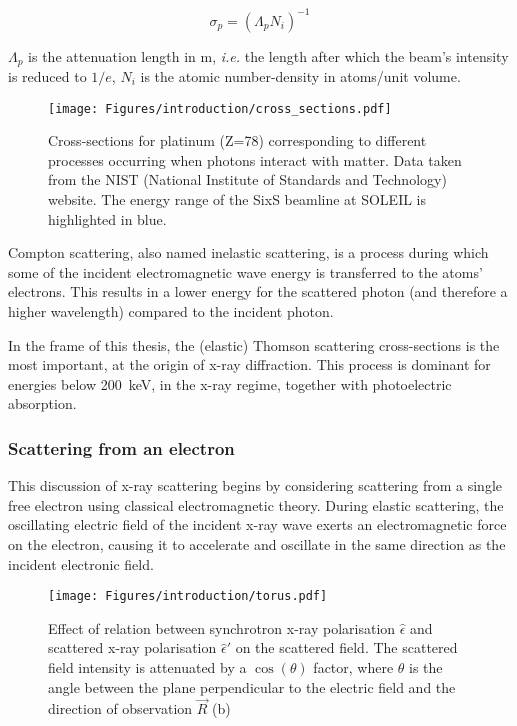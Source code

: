 \begin{equation}
	\sigma_p = (\Lambda_p N_i)^{-1}
\end{equation}

$\Lambda_p$ is the attenuation length in \unit{\meter}, \textit{i.e.} the length after which the beam's intensity is reduced to $1/e$, $N_i$ is the atomic number-density in atoms/unit volume.

\begin{figure}[!htb]
    \centering
    \texttt{[image: Figures/introduction/cross\_sections.pdf]}
    \caption{
        Cross-sections for platinum (Z=78) corresponding to different processes occurring when photons interact with matter.
        Data taken from the NIST (National Institute of Standards and Technology) \parencite{NIST_cross_sections} website.
        The energy range of the SixS beamline at SOLEIL is highlighted in blue.
    }
    \label{fig:cross_sections}
\end{figure}

Compton scattering, also named inelastic scattering, is a process during which some of the incident electromagnetic wave energy is transferred to the atoms' electrons.
This results in a lower energy for the scattered photon (and therefore a higher wavelength) compared to the incident photon.

In the frame of this thesis, the (elastic) Thomson scattering cross-sections is the most important, at the origin of x-ray diffraction.
This process is dominant for energies below \qty{200}{\keV}, in the x-ray regime, together with photoelectric absorption.

\subsubsection{Scattering from an electron}

This discussion of x-ray scattering begins by considering scattering from a single free electron using classical electromagnetic theory.
During elastic scattering, the oscillating electric field of the incident x-ray wave exerts an electromagnetic force on the electron, causing it to accelerate and oscillate in the same direction as the incident electronic field.

\begin{figure}[!htb]
    \centering
    \texttt{[image: Figures/introduction/torus.pdf]}
    \caption{
        Effect of relation between synchrotron x-ray polarisation $\hat{\epsilon}$ and scattered x-ray polarisation $\hat{\epsilon}'$ on the scattered field.
        The scattered field intensity is attenuated by a $\cos{(\theta)}$ factor, where $\theta$ is the angle between the plane perpendicular to the electric field and the direction of observation $\vec{R}$ (b)
    }
    \label{fig:polarization_effect}
\end{figure}

